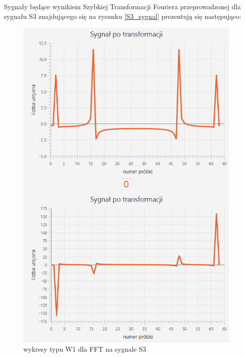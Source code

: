 \documentclass[12pt]{article}
\begin{document}
Sygnały będące wynikiem Szybkiej Transformacji Fouriera przeprowadzonej dla sygnału S3 znajdującego się na rysunku \ref{S3_sygnal} prezentują się następująco:
\begin{figure}[H]
	\centering
	\includegraphics[width=\linewidth]{S3_FFT_W1.png}
	\caption{wykresy typu W1 dla FFT na sygnale S3}
	\label{S3_FFT_W1}
\end{figure}
\end{document}
